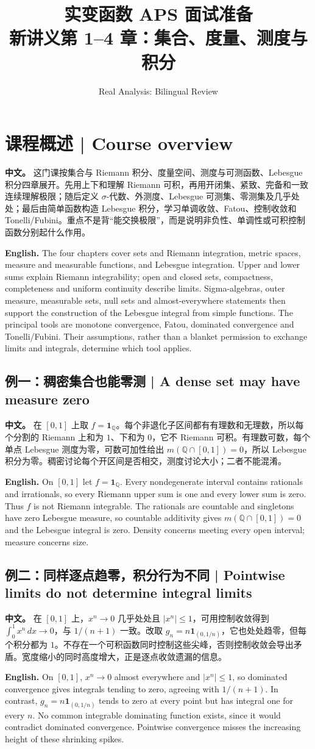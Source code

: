 \documentclass[UTF8,11pt,a4paper]{ctexart}
\title{实变函数 APS 面试准备\\[4pt]\large 新讲义第 1--4 章：集合、度量、测度与积分}
\author{Real Analysis: Bilingual Review}
\date{}
\let\APSsubsection\subsection
\renewcommand{\subsection}[1]{\Needspace{6\baselineskip}\APSsubsection{#1}}
\newcommand{\APS}[2]{\par\noindent\textbf{中文。} #1\par\noindent\textbf{English.} #2\par\smallskip}
\begin{document}
\maketitle

\section*{课程概述 | Course overview}
\APS{这门课按集合与 Riemann 积分、度量空间、测度与可测函数、Lebesgue 积分四章展开。先用上下和理解 Riemann 可积，再用开闭集、紧致、完备和一致连续理解极限；随后定义 $\sigma$-代数、外测度、Lebesgue 可测集、零测集及几乎处处；最后由简单函数构造 Lebesgue 积分，学习单调收敛、Fatou、控制收敛和 Tonelli/Fubini。重点不是背“能交换极限”，而是说明非负性、单调性或可积控制函数分别起什么作用。}{The four chapters cover sets and Riemann integration, metric spaces, measure and measurable functions, and Lebesgue integration. Upper and lower sums explain Riemann integrability; open and closed sets, compactness, completeness and uniform continuity describe limits. Sigma-algebras, outer measure, measurable sets, null sets and almost-everywhere statements then support the construction of the Lebesgue integral from simple functions. The principal tools are monotone convergence, Fatou, dominated convergence and Tonelli/Fubini. Their assumptions, rather than a blanket permission to exchange limits and integrals, determine which tool applies.}
\APSsubsection*{例一：稠密集合也能零测 | A dense set may have measure zero}
\APS{在 $[0,1]$ 上取 $f=\mathbf1_{\mathbb Q}$。每个非退化子区间都有有理数和无理数，所以每个分割的 Riemann 上和为 $1$、下和为 $0$，它不 Riemann 可积。有理数可数，每个单点 Lebesgue 测度为零，可数可加性给出 $m(\mathbb Q\cap[0,1])=0$，所以 Lebesgue 积分为零。稠密讨论每个开区间是否相交，测度讨论大小；二者不能混淆。}{On $[0,1]$ let $f=\mathbf1_{\mathbb Q}$. Every nondegenerate interval contains rationals and irrationals, so every Riemann upper sum is one and every lower sum is zero. Thus $f$ is not Riemann integrable. The rationals are countable and singletons have zero Lebesgue measure, so countable additivity gives $m(\mathbb Q\cap[0,1])=0$ and the Lebesgue integral is zero. Density concerns meeting every open interval; measure concerns size.}
\APSsubsection*{例二：同样逐点趋零，积分行为不同 | Pointwise limits do not determine integral limits}
\APS{在 $[0,1]$ 上，$x^n\to0$ 几乎处处且 $|x^n|\le1$，可用控制收敛得到 $\int_0^1x^n\,dx\to0$，与 $1/(n+1)$ 一致。改取 $g_n=n\mathbf1_{(0,1/n)}$，它也处处趋零，但每个积分都为 $1$。不存在一个可积函数同时控制这些尖峰，否则控制收敛会导出矛盾。宽度缩小的同时高度增大，正是逐点收敛遗漏的信息。}{On $[0,1]$, $x^n\to0$ almost everywhere and $|x^n|\le1$, so dominated convergence gives integrals tending to zero, agreeing with $1/(n+1)$. In contrast, $g_n=n\mathbf1_{(0,1/n)}$ tends to zero at every point but has integral one for every $n$. No common integrable dominating function exists, since it would contradict dominated convergence. Pointwise convergence misses the increasing height of these shrinking spikes.}
\end{document}
